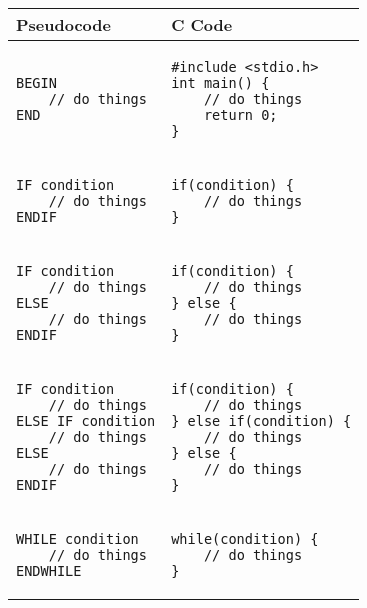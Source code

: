 \documentclass{lab}
\begin{document}
\begin{table}[H]
\centering
\begin{tabular}{ll}
Pseudocode & C Code \\
\hline
\begin{lstlisting}[style=pseudo]
BEGIN
	// do things
END
\end{lstlisting}&

\begin{lstlisting}[style=Ctable]
#include <stdio.h>
int main() {
	// do things
	return 0;
}
\end{lstlisting}\\
\hline

\begin{lstlisting}[style=pseudo]
IF condition
	// do things
ENDIF
\end{lstlisting}&

\begin{lstlisting}[style=Ctable]
if(condition) {
	// do things
}
\end{lstlisting}\\
\hline

\begin{lstlisting}[style=pseudo]
IF condition
	// do things
ELSE
	// do things
ENDIF
\end{lstlisting}&

\begin{lstlisting}[style=Ctable]
if(condition) {
	// do things
} else {
	// do things
}
\end{lstlisting}\\
\hline

\begin{lstlisting}[style=pseudo]
IF condition
	// do things
ELSE IF condition
	// do things
ELSE
	// do things
ENDIF
\end{lstlisting}&

\begin{lstlisting}[style=Ctable]
if(condition) {
	// do things
} else if(condition) {
	// do things
} else {
	// do things
}
\end{lstlisting}\\
\hline

\begin{lstlisting}[style=pseudo]
WHILE condition
	// do things
ENDWHILE
\end{lstlisting}&

\begin{lstlisting}[style=Ctable]
while(condition) {
	// do things
}
\end{lstlisting}\\
\hline

\end{tabular}
\end{table}
\end{document}
